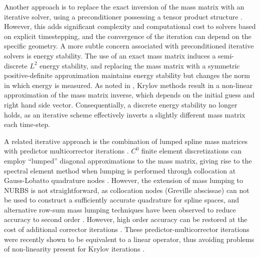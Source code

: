 \documentclass[preprint,10pt]{elsarticle}
\begin{document}
Another approach is to replace the exact inversion of the mass matrix with an iterative solver, using a preconditioner possessing a tensor product structure \cite{gao2014fast}.  However, this adds significant complexity and computational cost to solvers based on explicit timestepping, and the convergence of the iteration can depend on the specific geometry.  A more subtle concern associated with preconditioned iterative solvers is energy stability.  The use of an exact mass matrix induces a semi-discrete $L^2$ energy stability, and replacing the mass matrix with a symmetric positive-definite approximation maintains energy stability but changes the norm in which energy is measured.  As noted in \cite{wathen2009chebyshev}, Krylov methods result in a non-linear approximation of the mass matrix inverse, which depends on the initial guess and right hand side vector.  Consequentially, a discrete energy stability no longer holds, as an iterative scheme effectively inverts a slightly different mass matrix each time-step.  

A related iterative approach is the combination of lumped spline mass matrices with predictor multicorrector iterations \cite{auricchio2012isogeometric}.  $C^0$ finite element discretizations can employ ``lumped'' diagonal approximations to the mass matrix, giving rise to the spectral element method when lumping is performed through collocation at Gauss-Lobatto quadrature nodes \cite{patera1984spectral}.  %
However, the extension of mass lumping to NURBS is not straightforward, as collocation nodes (Greville abscissae) can not be used to construct a sufficiently accurate quadrature for spline spaces, and alternative row-sum mass lumping techniques have been observed to reduce accuracy to second order \cite{cottrell2006isogeometric}.  However, high order accuracy can be restored at the cost of additional corrector iterations \cite{auricchio2012isogeometric}.  These predictor-multicorrector iterations were recently shown to be equivalent to a linear operator, thus avoiding problems of non-linearity present for Krylov iterations \cite{evans2017explicit}.  
\end{document}
